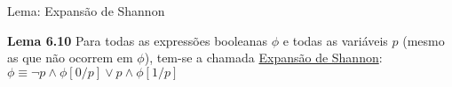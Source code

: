 \expandafter\documentclass\expandafter[table, usenames, svgnames, dvipsnames,14pt, \classopts]{beamer}
\begin{document}
\begin{frame}{Lema: Expansão de Shannon}

    \begin{block}{\textbf{Lema 6.10}}
        Para todas as expressões booleanas $\phi$ e todas as variáveis $p$ (mesmo as que não ocorrem em $\phi$), tem-se a chamada \underline{Expansão de Shannon}:\\[1em]
        $\phi \equiv \lnot{p} \land \phi[0/p] \lor p \land \phi[1/p]$
    \end{block}

\end{frame}
\end{document}
